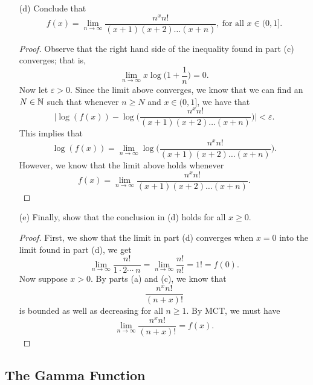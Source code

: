 \begin{enumerate}
\begin{proof}
\begin{align*}
            \end{align*}
            Hence, we have reached our desired result that
            \[  0 \leq \log(f(x)) - \log \Big( \frac{ n^{x} n!  }{ (x+1)(x+2) \dotsb (x+n)  }  \Big) \leq x \log \Big( 1 + \frac{ 1 }{ n }  \Big). \]
            \end{proof}
        \item[(d)] Conclude that 
            \[  f(x) = \lim_{ n \to \infty  }  \frac{ n^{x} n!  }{ (x+1)(x+2) \dots (x+n)  }, \ \text{for all } x \in (0,1]. \]
            \begin{proof}
                Observe that the right hand side of the inequality found in part (c) converges; that is, 
                \[  \lim_{ n \to \infty  }  x \log \Big( 1 + \frac{ 1 }{ n }  \Big) = 0.\] Now let \( \varepsilon > 0  \). Since the limit above converges, we know that we can find an \( N \in \mathbb{N}  \) such that whenever \( n \geq N  \) and \( x \in (0,1] \), we have that 
                \[  \Bigg| \log(f(x)) - \log \Big( \frac{ n^{x} n!  }{ (x+1)(x+2) \dots (x+n)  }  \Big) \Bigg| < \varepsilon.  \]
                This implies that 
                \[  \log(f(x)) = \lim_{ n \to \infty  }  \log \Big( \frac{ n^{x} n!  }{ (x+1) (x+2) \dots (x+n)  }  \Big). \]
                However, we know that the limit above holds whenever 
                \[  f(x) = \lim_{ n \to \infty  } \frac{ n^{x} n!  }{ (x+1)(x+2) \dots (x+n)  }.   \]
            \end{proof}
        \item[(e)] Finally, show that the conclusion in (d) holds for all \(  x \geq 0  \).
            \begin{proof}
            First, we show that the limit in part (d) converges when \( x = 0  \) into the limit found in part (d), we get 
            \[  \lim_{ n \to \infty  }  \frac{ n!  }{ 1 \cdot 2  \dotsb \  n } = \lim_{ n \to \infty  }  \frac{ n!  }{ n!  } = 1! = f(0)  .  \]
            Now suppose \( x > 0  \). By parts (a) and (c), we know that 
            \[  \frac{ n^{x} n!  }{ (n+x)! }  \] is bounded as well as decreasing for all \( n \geq 1  \). By MCT, we must have
            \[  \lim_{ n \to \infty  }  \frac{ n^{x} n!  }{ (n+x)! } = f(x). \]
            \end{proof}
\end{enumerate} 


\subsection{The Gamma Function}

